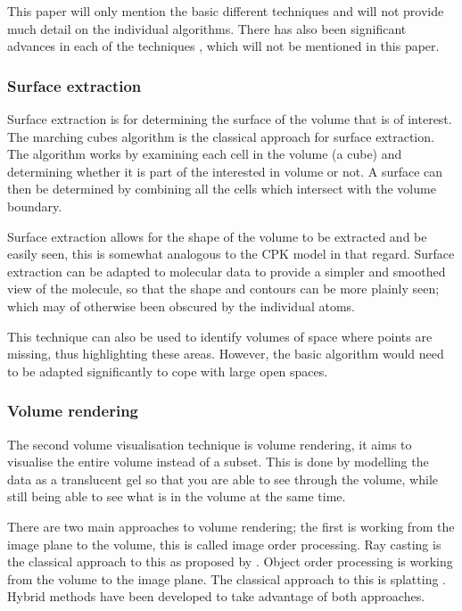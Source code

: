 \documentclass[twocolumn,a4paper]{article}
\begin{document}
This paper will only mention the basic different techniques and will not provide
much detail on the individual algorithms. There has also been significant
advances in each of the techniques \citep{brodlie01}, which will not be
mentioned in this paper.

\subsubsection*{Surface extraction}
Surface extraction is for determining the surface of the volume that is of
interest. The marching cubes algorithm \citep{lorensen87} is the classical
approach for surface extraction. The algorithm works by examining each cell in
the volume (a cube) and determining whether it is part of the interested in
volume or not. A surface can then be determined by combining all the cells which
intersect with the volume boundary.

Surface extraction allows for the shape of the volume to be extracted and be
easily seen, this is somewhat analogous to the CPK model in that regard. Surface
extraction can be adapted to molecular data to provide a simpler and smoothed
view of the molecule, so that the shape and contours can be more plainly seen;
which may of otherwise been obscured by the individual atoms.

This technique can also be used to identify volumes of space where points are
missing, thus highlighting these areas. However, the basic algorithm would need
to be adapted significantly to cope with large open spaces.

\subsubsection*{Volume rendering}
The second volume visualisation technique is volume rendering, it aims to
visualise the entire volume instead of a subset. This is done by modelling the
data as a translucent gel so that you are able to see through the volume, while
still being able to see what is in the volume at the same time.

There are two main approaches to volume rendering; the first is working from the
image plane to the volume, this is called image order processing. Ray casting is
the classical approach to this as proposed by \citet{levoy88}. Object order
processing is working from the volume to the image plane. The classical approach
to this is splatting \citep{westover89}. Hybrid methods have been developed to
take advantage of both approaches.
\end{document}
